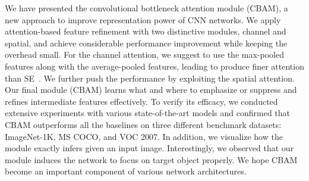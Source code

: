 \documentclass[runningheads]{llncs}
\newcommand{\ie}{\textit{i}.\textit{e}.}
\newcommand{\tabref}[1]{Table~\ref{#1}}
\begin{document}
We have presented the convolutional bottleneck attention module (CBAM), a new approach to improve representation power of CNN networks. 
We apply attention-based feature refinement with two distinctive modules, channel and spatial, and achieve considerable performance improvement while keeping the overhead small.
For the channel attention, we suggest to use the max-pooled features along with the average-pooled features, leading to produce finer attention than SE~\cite{hu2017squeeze}. We further push the performance by exploiting the spatial attention.
Our final module (CBAM) learns what and where to emphasize or suppress and refines intermediate features effectively.
To verify its efficacy, we conducted extensive experiments with various state-of-the-art models and confirmed that CBAM outperforms all the baselines on three different benchmark datasets: ImageNet-1K, MS COCO, and VOC 2007. In addition, we visualize how the module exactly infers given an input image. Interestingly, we observed that our module induces the network to focus on target object properly. We hope CBAM become an important component of various network architectures.


\clearpage

% 
% 



\end{document}
